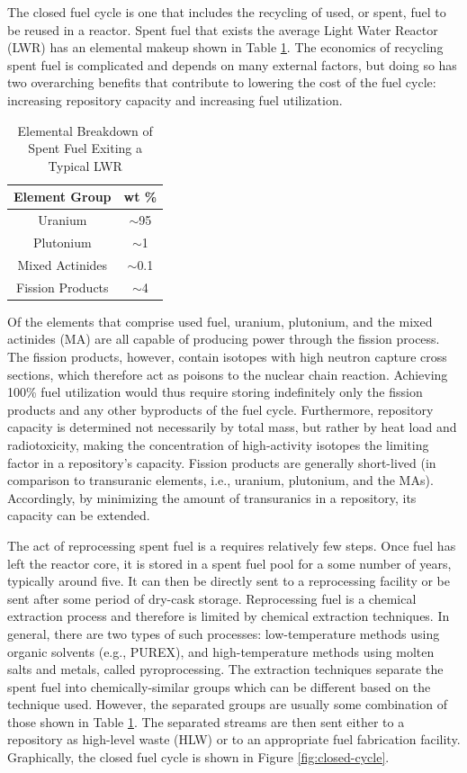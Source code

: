 The closed fuel cycle is one that includes the recycling of used, or spent, fuel
to be reused in a reactor. Spent fuel that exists the average Light Water
Reactor (LWR) has an elemental makeup shown in Table \ref{tab:lwr_fuel}. The
economics of recycling spent fuel is complicated and depends on many external
factors, but doing so has two overarching benefits that contribute to lowering
the cost of the fuel cycle: increasing repository capacity and increasing fuel
utilization. 

\begin{table} [h]
\centering
\begin{tabular} {|c|c|} 
\hline
Element Group & wt \% \\
\hline
Uranium           & $\sim$95  \\
Plutonium         & $\sim$1   \\
Mixed Actinides   & $\sim$0.1 \\
Fission Products  & $\sim$4   \\
\hline
\end{tabular}
\caption{Elemental Breakdown of Spent Fuel Exiting a Typical LWR}
\label{tab:lwr_fuel}
\end{table}

Of the elements that comprise used fuel, uranium, plutonium, and the mixed
actinides (MA) are all capable of producing power through the fission
process. The fission products, however, contain isotopes with high neutron
capture cross sections, which therefore act as poisons to the nuclear chain
reaction.  Achieving 100\% fuel utilization would thus require storing
indefinitely only the fission products and any other byproducts of the fuel
cycle. Furthermore, repository capacity is determined not necessarily by total
mass, but rather by heat load and radiotoxicity, making the concentration of
high-activity isotopes the limiting factor in a repository's capacity. Fission
products are generally short-lived (in comparison to transuranic elements, i.e.,
uranium, plutonium, and the MAs). Accordingly, by minimizing the amount of
transuranics in a repository, its capacity can be extended.

The act of reprocessing spent fuel is a requires relatively few steps. Once fuel
has left the reactor core, it is stored in a spent fuel pool for a some number
of years, typically around five. It can then be directly sent to a reprocessing
facility or be sent after some period of dry-cask storage. Reprocessing fuel is
a chemical extraction process and therefore is limited by chemical extraction
techniques. In general, there are two types of such processes: low-temperature
methods using organic solvents (e.g., PUREX), and high-temperature methods using
molten salts and metals, called pyroprocessing. The extraction techniques
separate the spent fuel into chemically-similar groups which can be different
based on the technique used. However, the separated groups are usually some
combination of those shown in Table \ref{tab:lwr_fuel}. The separated streams
are then sent either to a repository as high-level waste (HLW) or to an
appropriate fuel fabrication facility. Graphically, the closed fuel cycle is
shown in Figure \ref{fig:closed-cycle}.

